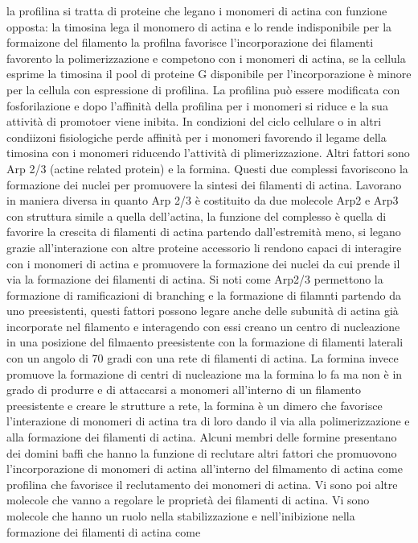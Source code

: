 la profilina si tratta di proteine che legano i monomeri di actina con funzione opposta: la timosina lega il monomero di actina e lo rende indisponibile per la formaizone del filamento
la profilna favorisce l'incorporazione dei filamenti favorento la polimerizzazione e competono con i monomeri di actina, se la cellula esprime la timosina il pool di proteine G
disponibile per l'incorporazione \`e minore per la cellula con espressione di profilina. La profilina pu\`o essere modificata con fosforilazione e dopo l'affinit\`a della profilina per 
i monomeri si riduce e la sua attivit\`a di promotoer viene inibita. In condizioni del ciclo cellulare o in altri condiizoni fisiologiche perde affinit\`a per i monomeri favorendo il 
legame della timosina con i monomeri riducendo l'attivit\`a di plimerizzazione. Altri fattori sono Arp 2/3 (actine related protein) e la formina. Questi due complessi favoriscono la 
formazione dei nuclei per promuovere la sintesi dei filamenti di actina. Lavorano in maniera diversa in quanto Arp 2/3 \`e costituito da due molecole Arp2 e Arp3 con struttura simile a
quella dell'actina, la funzione del complesso \`e quella di favorire la crescita di filamenti di actina partendo dall'estremit\`a meno, si legano grazie all'interazione con altre 
proteine accessorio li rendono capaci di interagire con i monomeri di actina e promuovere la formazione dei nuclei da cui prende il via la formazione dei filamenti di actina. Si noti
come Arp2/3 permettono la formazione di ramificazioni di branching e la formazione di filamnti partendo da uno preesistenti, questi fattori possono legare anche delle subunit\`a di actina
gi\`a incorporate nel filamento e interagendo con essi creano un centro di nucleazione in una posizione del filmaento preesistente con la formazione di filamenti laterali con un angolo
di 70 gradi con una rete di filamenti di actina. La formina invece promuove la formazione di centri di nucleazione ma la formina lo fa ma non \`e in grado di produrre e di attaccarsi a
monomeri all'interno di un filamento preesistente e creare le strutture a rete, la formina \`e un dimero che favorisce l'interazione di monomeri di actina tra di loro dando il via alla
polimerizzazione e alla formazione dei filamenti di actina. Alcuni membri delle formine presentano dei domini baffi che hanno la funzione di reclutare altri fattori che promuovono 
l'incorporazione di monomeri di actina all'interno del filmamento di actina come profilina che favorisce il reclutamento dei monomeri di actina. Vi sono poi altre molecole che vanno 
a regolare le propriet\`a dei filamenti di actina. Vi sono molecole che hanno un ruolo nella stabilizzazione e nell'inibizione nella formazione dei filamenti di actina come 

